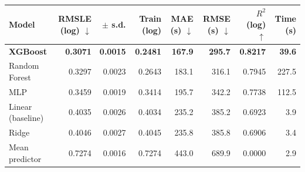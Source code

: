 \begin{tabular}{@{}lrrrrrrr@{}}
\toprule
Model & RMSLE (log) $\downarrow$ & $\pm$ s.d. & Train (log) & MAE (s) $\downarrow$ & RMSE (s) $\downarrow$ & $R^2$ (log) $\uparrow$ & Time (s) \\
\midrule
\textbf{XGBoost} & \textbf{0.3071} & \textbf{0.0015} & \textbf{0.2481} & \textbf{167.9} & \textbf{295.7} & \textbf{0.8217} & \textbf{39.6} \\
Random Forest & 0.3297 & 0.0023 & 0.2643 & 183.1 & 316.1 & 0.7945 & 227.5 \\
MLP & 0.3459 & 0.0019 & 0.3414 & 195.7 & 342.2 & 0.7738 & 112.5 \\
Linear (baseline) & 0.4035 & 0.0026 & 0.4034 & 235.2 & 385.2 & 0.6923 & 3.9 \\
Ridge & 0.4046 & 0.0027 & 0.4045 & 235.8 & 385.8 & 0.6906 & 3.4 \\
Mean predictor & 0.7274 & 0.0016 & 0.7274 & 443.0 & 689.9 & 0.0000 & 2.9 \\
\bottomrule
\end{tabular}
